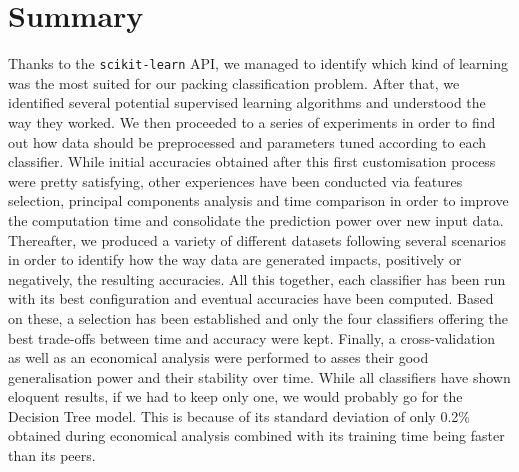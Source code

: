 \section{Summary} %

Thanks to the \texttt{scikit-learn} API, we managed to identify which kind of learning was the most suited for our packing classification problem. After that, we identified several potential supervised learning algorithms and understood the way they worked. We then proceeded to a series of experiments in order to find out how data should be preprocessed and parameters tuned according to each classifier. While initial accuracies obtained after this first customisation process were pretty satisfying, other experiences have been conducted via features selection, principal components analysis and time comparison in order to improve the computation time and consolidate the prediction power over new input data. Thereafter, we produced a variety of different datasets following several scenarios in order to identify how the way data are generated impacts, positively or negatively, the resulting accuracies. All this together, each classifier has been run with its best configuration and eventual accuracies have been computed. Based on these, a selection has been established and only the four classifiers offering the best trade-offs between time and accuracy were kept. Finally, a cross-validation as well as an economical analysis were performed to asses their good generalisation power and their stability over time. While all classifiers have shown eloquent results, if we had to keep only one, we would probably go for the Decision Tree model. This is because of its standard deviation of only 0.2\% obtained during economical analysis combined with its training time being faster than its peers.